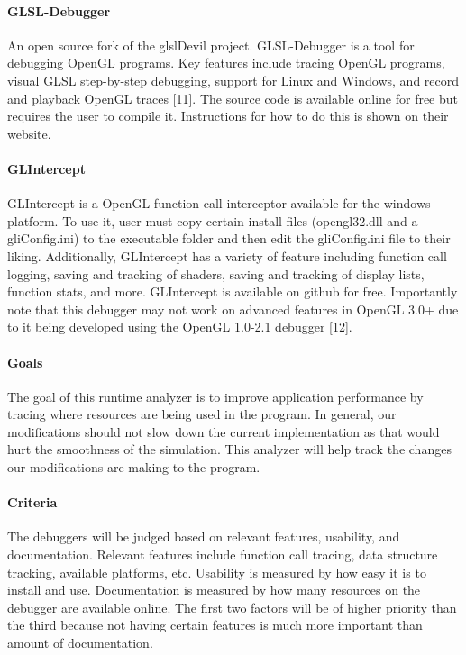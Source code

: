 \paragraph{GLSL-Debugger}
An open source fork of the glslDevil project.
GLSL-Debugger is a tool for debugging OpenGL programs.
Key features include tracing OpenGL programs, visual GLSL step-by-step debugging, support for Linux and Windows, and record and playback OpenGL traces [11].
The source code is available online for free but requires the user to compile it.
Instructions for how to do this is shown on their website.

\paragraph{GLIntercept}
GLIntercept is a OpenGL function call interceptor available for the windows platform. \cite{glsl}
To use it, user must copy certain install files (opengl32.dll and a gliConfig.ini) to the executable folder and then edit the gliConfig.ini file to their liking.
Additionally, GLIntercept has a variety of feature including function call logging, saving and tracking of shaders, saving and tracking of display lists, function stats, and more.
GLIntercept is available on github for free.
Importantly note that this debugger may not work on advanced features in OpenGL 3.0+ due to it being developed using the OpenGL 1.0-2.1 debugger [12].

\paragraph{Goals}
The goal of this runtime analyzer is to improve application performance by tracing where resources are being used in the program.
In general, our modifications should not slow down the current implementation as that would hurt the smoothness of the simulation.
This analyzer will help track the changes our modifications are making to the program.

\paragraph{Criteria}
The debuggers will be judged based on relevant features, usability, and documentation.
Relevant features include function call tracing, data structure tracking, available platforms, etc.
Usability is measured by how easy it is to install and use.
Documentation is measured by how many resources on the debugger are available online.
The first two factors will be of higher priority than the third because not having certain features is much more important than amount of documentation.

